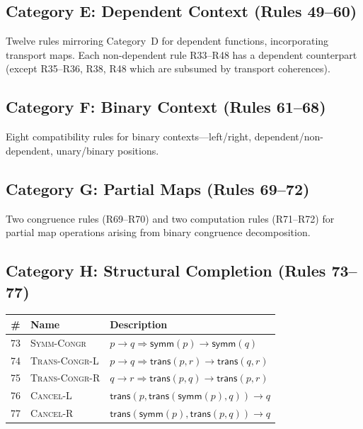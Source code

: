 \documentclass[manuscript]{BSLstyle}
\newcommand{\symm}{\mathsf{symm}}
\newcommand{\trans}{\mathsf{trans}}
\begin{document}
\subsection*{Category E: Dependent Context (Rules 49--60)}

Twelve rules mirroring Category~D for dependent functions, incorporating
transport maps.  Each non-dependent rule R33--R48 has a dependent
counterpart (except R35--R36, R38, R48 which are subsumed by transport
coherences).

\subsection*{Category F: Binary Context (Rules 61--68)}

Eight compatibility rules for binary contexts---left/right, dependent/non-dependent,
unary/binary positions.

\subsection*{Category G: Partial Maps (Rules 69--72)}

Two congruence rules (R69--R70) and two computation rules (R71--R72)
for partial map operations arising from binary congruence decomposition.

\subsection*{Category H: Structural Completion (Rules 73--77)}

\begin{center}
\renewcommand{\arraystretch}{1.4}
\small
\begin{tabular}{clp{7cm}}
\toprule
\# & \textbf{Name} & \textbf{Description} \\
\midrule
73 & \textsc{Symm-Congr} & $p \to q \Rightarrow \symm(p) \to \symm(q)$ \\
74 & \textsc{Trans-Congr-L} & $p \to q \Rightarrow \trans(p,r) \to \trans(q,r)$ \\
75 & \textsc{Trans-Congr-R} & $q \to r \Rightarrow \trans(p,q) \to \trans(p,r)$ \\
76 & \textsc{Cancel-L} & $\trans(p, \trans(\symm(p), q)) \to q$ \\
77 & \textsc{Cancel-R} & $\trans(\symm(p), \trans(p, q)) \to q$ \\
\bottomrule
\end{tabular}
\end{center}

\bigskip



\end{document}
